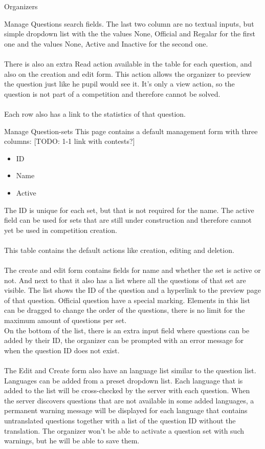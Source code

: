 \begin{section}{Organizers}
\begin{subsection}{Manage Questions}
		search fields. The last two column are no textual inputs, but simple dropdown
		list with the the values None, Official and Regalar for the first one and the
		values None, Active and Inactive for the second one.\\
		\\
		There is also an extra Read action available in the table for each question, and
		also on the creation and edit form. This action allows the organizer to preview
		the question just like he pupil would see it. It's only a view action, so the
		question is not part of a competition and therefore cannot be solved. \\
		\\
		Each row also has a link to the statistics of that question.
	\end{subsection}
	
	\begin{subsection}{Manage Question-sets}
		This page contains a default management form with three columns: [TODO: 1-1 link with contests?]
		\begin{itemize}
			\item ID
			\item Name
			\item Active
		\end{itemize}
		The ID is unique for each set, but that is not required for the name. The active
		field can be used for sets that are still under construction and therefore cannot
		yet be used in competition creation.\\
		\\
		This table contains the default actions like creation, editing and deletion. \\
		\\
		The create and edit form contains fields for name and whether the set is active or
		not. And next to that it also has a list where all the questions of that set are
		visible. The list shows the ID of the question and a hyperlink to the preview
		page of that question. Official question have a special marking. Elements in this
		list can be dragged to change the order of the questions, there is no limit for 
		the maximum amount of questions per set. \\
		On the bottom of the list, there is an extra input field where questions can be
		added by their ID, the organizer can be prompted with an error message for when
		the question ID does not exist. \\
		\\
		The Edit and Create form also have an language list similar to the question list.
		Languages can be added from a preset dropdown list. Each language that is added
		to the list will be cross-checked by the server with each question. When the
		server discovers questions that are not available in some added languages, a
		permanent warning message will be displayed for each language that contains
		untranslated questions together with a list of the question ID without the
		translation. The organizer won't be able to activate a question set with such
		warnings, but he will be able to save them.
		

\end{subsection}
\end{section}
